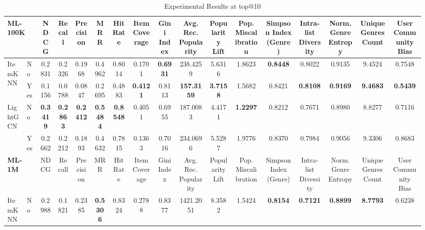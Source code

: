 \begin{table}[htbp]
\centering
\caption{Experimental Results at top@10}
\begin{adjustbox}{width=\textwidth,center}
\begin{tabular}{llccccccccccccccc}
\toprule
\multicolumn{2}{l}{\textbf{ML-100K}} & NDCG & Recall & Precision & MRR & Hit Rate & Item Coverage & Gini Index & Avg. Rec. Popularity & Popularity Lift & Pop. Miscalibration & Simpson Index (Genre) & Intra-list Diversity & Norm. Genre Entropy & Unique Genres Count & User Community Bias \\
\midrule
\multirow{2}{*}{ItemKNN} & No & 0.2831 & 0.2326 & 0.1968 & 0.4962 & 0.8014 & 0.1701 & \textbf{0.6931} & 238.4259 & 5.6316 & 1.8623 & \textbf{0.8448} & 0.8022 & 0.9135 & 9.4524 & 0.7548 \\
 & Yes & \cellcolor{red!40} 0.1156 & \cellcolor{red!40} 0.0788 & \cellcolor{red!40} 0.0847 & \cellcolor{red!40} 0.2695 & \cellcolor{red!40} 0.4883 & \textbf{\cellcolor{green!40} 0.4121} & \cellcolor{red!40} 0.8113 & \textbf{\cellcolor{green!40} 157.3159} & \textbf{\cellcolor{green!40} 3.7158} & \cellcolor{green!40} 1.5682 & \cellcolor{red!20} 0.8421 & \textbf{\cellcolor{green!20} 0.8108} & \textbf{\cellcolor{green!20} 0.9169} & \textbf{\cellcolor{green!20} 9.4683} & \textbf{\cellcolor{green!40} 0.5439} \\
\cmidrule{1-17}
\multirow{2}{*}{LightGCN} & No & \textbf{0.3419} & \textbf{0.2863} & \textbf{0.2412} & \textbf{0.5484} & \textbf{0.8548} & 0.4051 & 0.6955 & 187.0083 & 4.4171 & \textbf{1.2297} & 0.8212 & 0.7671 & 0.8980 & 8.8277 & 0.7116 \\
 & Yes & \cellcolor{red!40} 0.2662 & \cellcolor{red!40} 0.2212 & \cellcolor{red!40} 0.1893 & \cellcolor{red!40} 0.4632 & \cellcolor{red!40} 0.7815 & \cellcolor{red!40} 0.1363 & \cellcolor{red!20} 0.7016 & \cellcolor{red!40} 234.0696 & \cellcolor{red!40} 5.5287 & \cellcolor{red!40} 1.9776 & \cellcolor{green!20} 0.8370 & \cellcolor{green!20} 0.7984 & \cellcolor{green!20} 0.9056 & \cellcolor{green!40} 9.3306 & \cellcolor{red!40} 0.8683 \\
\midrule\midrule
\multicolumn{2}{l}{\textbf{ML-1M}} & NDCG & Recall & Precision & MRR & Hit Rate & Item Coverage & Gini Index & Avg. Rec. Popularity & Popularity Lift & Pop. Miscalibration & Simpson Index (Genre) & Intra-list Diversity & Norm. Genre Entropy & Unique Genres Count & User Community Bias \\
\midrule
\multirow{2}{*}{ItemKNN} & No & 0.2988 & 0.1821 & 0.2385 & \textbf{0.5306} & 0.8324 & 0.2788 & 0.8377 & 1421.2051 & 8.3582 & 1.5424 & \textbf{0.8154} & \textbf{0.7121} & \textbf{0.8899} & \textbf{8.7793} & 0.6238 \\

\end{tabular}
\end{adjustbox}
\end{table}
